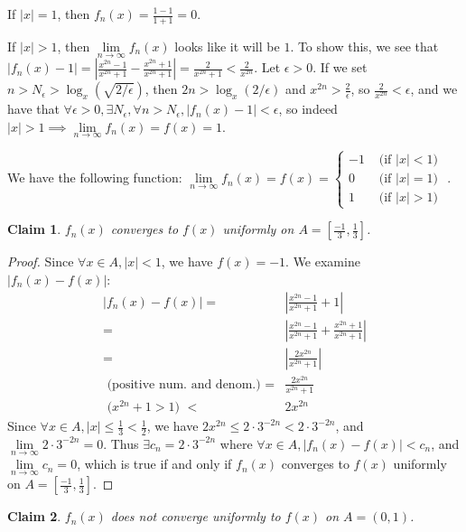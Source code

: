 \documentclass{article}
\newcommand{\eps}{\ensuremath{\epsilon}}
\newcommand{\limxy}[2]{\ensuremath{\underset{#1 \to #2 }{\lim}}}
\newcommand{\pt}[1]{\textrm{ #1 }}
\newtheorem{clm}{Claim}
\begin{document}
If $|x| = 1$, then $f_n(x) = \frac{1- 1}{1 + 1}  = 0$.

If $|x| > 1$, then $\limxy{n}{\infty}f_n(x)$ looks like it will be $1$.
To show this,
we see that $|f_n(x) - 1| = |\frac{x^{2n} -1}{x^{2n} + 1} - \frac{x^{2n} + 1}{x^{2n} + 1}|
= \frac{2}{x^{2n} + 1} < \frac{2}{x^{2n}}$.
Let $\eps > 0$.
If we set $n > N_\eps > \log_x(\sqrt{2/\eps})$,
then $2n > \log_x(2/\eps)$ and $x^{2n} > \frac{2}{\eps}$,
so $\frac{2}{x^{2n}} < \eps$,
and we have that
$\forall \eps > 0, \exists N_\eps, \forall n > N_\eps, |f_n(x) - 1| < \eps$,
so indeed $|x| > 1 \implies \limxy{n}{\infty} f_n(x) = f(x) = 1$.

We have the following function:
$\limxy{n}{\infty} f_n(x) = f(x) =
\begin{cases}
	-1 & \pt{(if $|x| < 1$)} \\
	 0 & \pt{(if $|x| = 1$)} \\
	 1 & \pt{(if $|x| > 1$)}
\end{cases}$.

\begin{clm}
	$f_n(x)$ converges to $f(x)$ uniformly on $A = [\frac{-1}{3}, \frac{1}{3}]$.
\end{clm}

\begin{proof}
	Since $\forall x \in A, |x| < 1$,
	we have $f(x) = -1$.
	We examine $|f_n(x) - f(x)|$:
	\begin{align}
		|f_n(x) - f(x)| = & |\frac{x^{2n} - 1}{x^{2n} + 1} + 1| \\
		= & |\frac{x^{2n} - 1}{x^{2n} + 1} + \frac{x^{2n} + 1}{x^{2n} + 1}| \\
		= & |\frac{2x^{2n}}{x^{2n} + 1}| \\
		\pt{(positive num. and denom.)} = & \frac{2x^{2n}}{x^{2n} + 1} \\
		\pt{($x^{2n} + 1 > 1$)} < & 2x^{2n}
	\end{align}
	Since $\forall x \in A, |x| \le \frac{1}{3} < \frac{1}{2}$,
	we have $2x^{2n} \le 2 \cdot 3^{-2n} < 2 \cdot 3^{-2n}$,
	and $\limxy{n}{\infty} 2 \cdot 3^{-2n} = 0$.
	Thus $\exists c_n = 2\cdot 3^{-2n}$ where $\forall x \in A, |f_n(x) - f(x)| < c_n$,
	and $\limxy{n}{\infty} c_n = 0$,
	which is true if and only if
	$f_n(x)$ converges to $f(x)$ uniformly on $A = [\frac{-1}{3}, \frac{1}{3}]$.
\end{proof}

\begin{clm}
	$f_n(x)$ does not converge uniformly to $f(x)$ on $A = (0,1)$.
\end{clm}
\end{document}
